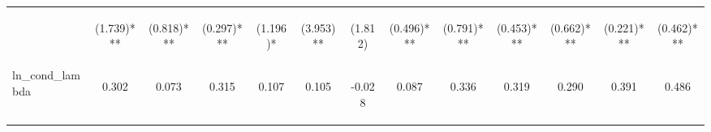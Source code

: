 \begin{center}
\begin{tabular}{lcccccccccccc}
\hline  & \begin{normalsize}(1.739)***\end{normalsize} & \begin{normalsize}(0.818)***\end{normalsize} & \begin{normalsize}(0.297)***\end{normalsize} & \begin{normalsize}(1.196)*\end{normalsize} & \begin{normalsize}(3.953)**\end{normalsize} & \begin{normalsize}(1.812)\end{normalsize} & \begin{normalsize}(0.496)***\end{normalsize} & \begin{normalsize}(0.791)***\end{normalsize} & \begin{normalsize}(0.453)***\end{normalsize} & \begin{normalsize}(0.662)***\end{normalsize} & \begin{normalsize}(0.221)***\end{normalsize} & \begin{normalsize}(0.462)***\end{normalsize}\\
\noalign{\smallskip}ln_cond_lambda & \begin{normalsize}0.302\end{normalsize} & \begin{normalsize}0.073\end{normalsize} & \begin{normalsize}0.315\end{normalsize} & \begin{normalsize}0.107\end{normalsize} & \begin{normalsize}0.105\end{normalsize} & \begin{normalsize}-0.028\end{normalsize} & \begin{normalsize}0.087\end{normalsize} & \begin{normalsize}0.336\end{normalsize} & \begin{normalsize}0.319\end{normalsize} & \begin{normalsize}0.290\end{normalsize} & \begin{normalsize}0.391\end{normalsize} & \begin{normalsize}0.486\end{normalsize}\\

\end{tabular}
\end{center}
